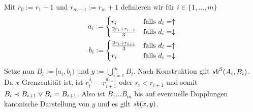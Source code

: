 \begin{bew}
%     
%     
    Mit $r_0 := r_1-1$ und $r_{m+1} := r_m+1$ definieren wir für $i \in \{1, ..., m\}$
    \begin{align*}
        a_i := 
            \begin{cases}
                r_i & \text{falls $d_i = \uparrow$}\\
                \frac{2r_i + r_{i-1}}{3} & \text{falls $d_i = \downarrow$}
            \end{cases}\\
        b_i := 
            \begin{cases}
                \frac{2r_i + r_{i+1}}{3} & \text{falls $d_i = \uparrow$}\\
                r_i & \text{falls $d_i = \downarrow$}
            \end{cases}
    \end{align*}
    Setze nun $B_i := [a_i, b_i)$ und $y := \bigcup_{i=1}^m B_i$.
    Nach Konstruktion gilt $\mathit{sb}^{\mathcal{S}}(A_i, B_i)$.
    Da $x$ Grenzentität ist, ist $r_{i}^{d_i} = r_{i+1}^{d_{i+1}}$ oder $r_i < r_{i+1}$ und somit   $B_i \prec B_{i+1} \lor B_i = B_{i+1}$.
    Also ist $B_1 ... B_m$ bis auf eventuelle Dopplungen kanonische Darstellung von $y$ und es gilt $\mathit{sb}(x,y)$.
\end{bew}

